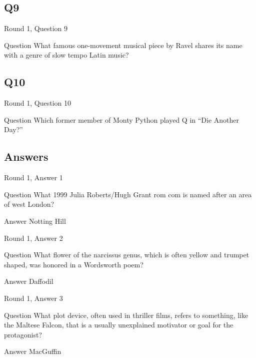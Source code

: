 \documentclass[11pt]{beamer}
\begin{document}
\subsection*{Q9}
\begin{frame}[t]{Round 1, Question 9}
\vspace{2em}
\begin{block}{Question}
What famous one-movement musical piece by Ravel shares its name with a genre of slow tempo Latin music\@?
\end{block}
\end{frame}
    

\subsection*{Q10}
\begin{frame}[t]{Round 1, Question 10}
\vspace{2em}
\begin{block}{Question}
Which former member of Monty Python played Q in ``Die Another Day?''
\end{block}
\end{frame}
    
\subsection{Answers}

\begin{frame}[t]{Round 1, Answer 1}
\vspace{2em}
\begin{block}{Question}
What 1999 Julia Roberts/Hugh Grant rom com is named after an area of west London\@?
\end{block}
\pause{}
\begin{block}{Answer}
Notting Hill
\end{block}
\end{frame}
    

\begin{frame}[t]{Round 1, Answer 2}
\vspace{2em}
\begin{block}{Question}
What flower of the narcissus genus, which is often yellow and trumpet shaped, was honored in a Wordsworth poem\@?
\end{block}
\pause{}
\begin{block}{Answer}
Daffodil
\end{block}
\end{frame}
    

\begin{frame}[t]{Round 1, Answer 3}
\vspace{2em}
\begin{block}{Question}
What plot device, often used in thriller films, refers to something, like the Maltese Falcon, that is a usually unexplained motivator or goal for the protagonist\@?
\end{block}
\pause{}
\begin{block}{Answer}
MacGuffin
\end{block}
\end{frame}
    
\end{document}
